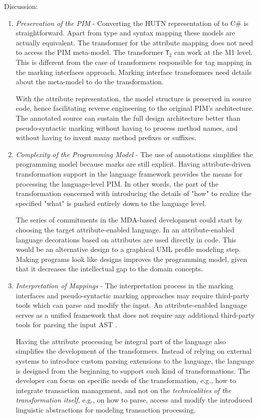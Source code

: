 \noindent Discussion:
\begin{enumerate}
\item \textit{Preservation of the PIM} - Converting the HUTN representation of  to C\# is straightforward. Apart from type and syntax mapping these models are actually equivalent. The transformer for the attribute mapping does not need to access the PIM meta-model. The transformer \texttt{T$_{2}$} can work at the M1 level. This is different from the case of transformers responsible for tag mapping in the marking interfaces approach. Marking interface transformers need details about the meta-model to do the transformation.

With the attribute representation, the model structure is preserved in source code, hence facilitating reverse engineering to the original PIM's architecture. The annotated source can sustain the full design architecture better than pseudo-syntactic marking without having to process method names, and without having to invent many method prefixes or suffixes. 

\item \textit{Complexity of the Programming Model} - The use of annotations simplifies the programming model because marks are still explicit. Having attribute-driven transformation support in the language framework provides the means for processing the language-level PIM. In other words, the part of the transformation concerned with introducing the details of "how" to realize the specified "what" is pushed entirely down to the language level.

The series of commitments in the MDA-based development could start by choosing the target attribute-enabled language. In an attribute-enabled language decorations based on attributes are used directly in code. This would be an alternative design to a graphical UML profile modeling step. Making programs look like designs improves the programming model, given that it decreases the intellectual gap to the domain concepts.

\item \textit{Interpretation of Mappings} -  The interpretation process in the marking interfaces and pseudo-syntactic marking approaches may require third-party tools which can parse and modify the input. An attribute-enabled language serves as a unified framework that does not require any additional third-party tools for parsing the input AST . 

Having the attribute processing be integral part of the language also simplifies the development of the transformers. Instead of relying on external systems to introduce custom parsing extensions to the language, the language is designed from the beginning to support such kind of transformations. The developer can focus on specific needs of the transformation, e.g., how to integrate transaction management, and not on the \textit{technicalities of the transformation itself}, e.g., on how to parse, access and modify the introduced linguistic abstractions for modeling transaction processing.


\end{enumerate}
